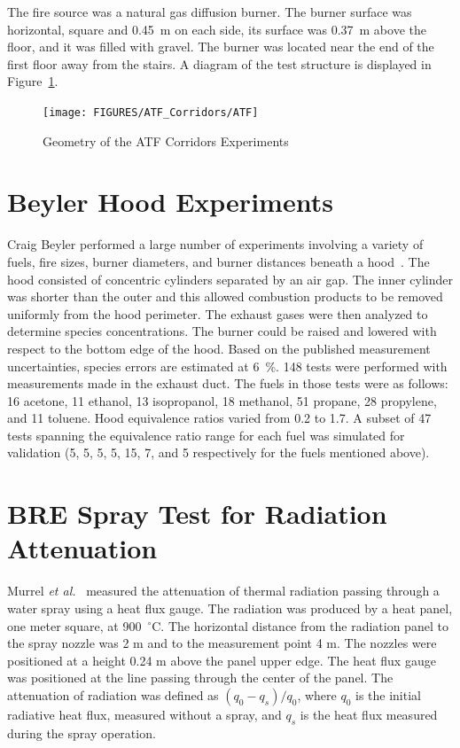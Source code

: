 The fire source was a natural gas diffusion burner.  The burner surface was horizontal, square and 0.45~m on each side, its surface was 0.37~m above the floor, and it was filled with gravel.
The burner was located near the end of the first floor away from the stairs. A diagram of the test structure is displayed in Figure~\ref{ATF Drawing}.


\begin{figure}
\begin{center}
\texttt{[image: FIGURES/ATF\_Corridors/ATF]}
\end{center}
\caption{Geometry of the ATF Corridors Experiments}
\label{ATF Drawing}
\end{figure}

\clearpage



\section{Beyler Hood Experiments}

Craig Beyler performed a large number of experiments involving a variety of fuels, fire sizes, burner diameters, and
burner distances beneath a hood~\cite{Beyler:Hood}.  The hood consisted of concentric cylinders separated
by an air gap.  The inner cylinder was shorter than the outer and this allowed combustion products to be removed
uniformly from the hood perimeter.  The exhaust gases were then analyzed to determine species concentrations.
The burner could be raised and lowered with respect to the bottom edge of the hood.  Based on the published
measurement uncertainties, species errors are estimated at 6~\%.  148 tests were performed with measurements made in the
exhaust duct.  The fuels in those tests were as follows: 16 acetone, 11 ethanol, 13 isopropanol, 18 methanol, 51 propane, 28 propylene, and 11 toluene.
Hood equivalence ratios varied from 0.2 to 1.7.  A subset of 47 tests spanning the equivalence ratio range for each fuel was simulated for
validation (5, 5, 5, 5, 15, 7, and 5 respectively for the fuels mentioned above).



\section{BRE Spray Test for Radiation Attenuation}

Murrel {\em et al.}~\cite{Murrel:1995} measured the attenuation of thermal radiation passing through a water
spray using a heat flux gauge. The radiation was produced by a heat panel, one meter square, at 900~$^\circ$C. The horizontal distance
from the radiation panel to the spray nozzle was 2 m and to the measurement point 4 m. The nozzles were positioned at
a height 0.24 m above the panel upper edge. The heat flux gauge was positioned at the line passing through the center
of the panel. The attenuation of radiation was defined as $(q_0-q_s)/q_0$, where $q_0$ is the initial radiative heat flux,
measured without a spray, and $q_s$ is the heat flux measured during the spray operation.

